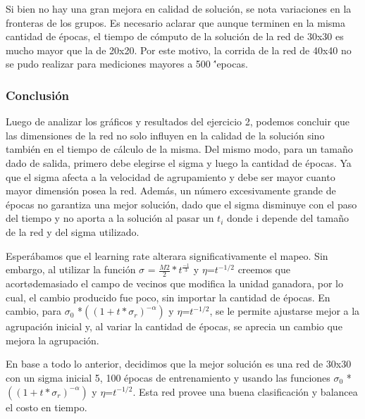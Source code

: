 Si bien no hay una gran mejora en calidad de soluci\'on, se nota variaciones en la fronteras de los grupos. Es necesario aclarar que aunque terminen en la misma cantidad de \'epocas, el tiempo de c\'omputo de la soluci\'on de la red de 30x30 es mucho mayor que la de 20x20. Por este motivo, la corrida de la red de 40x40 no se pudo realizar para mediciones mayores a 500 \''epocas.

\subsubsection{Conclusi\'on}

Luego de analizar los gr\'aficos y resultados del ejercicio 2, podemos concluir que las dimensiones de la red no solo influyen en la calidad de la soluci\'on sino tambi\'en en el tiempo de c\'alculo de la misma. Del mismo modo, para un tama\~no dado de salida, primero debe elegirse el sigma y luego la cantidad de \'epocas. Ya que el sigma afecta a la velocidad de agrupamiento y debe ser mayor cuanto mayor dimensi\'on posea la red. Adem\'as, un n\'umero excesivamente grande de \'epocas no garantiza una mejor soluci\'on, dado que el sigma disminuye con el paso del tiempo y no aporta a la soluci\'on al pasar un $t_i$ donde i depende del tama\~no de la red y del sigma utilizado.

Esper\'abamos que el learning rate alterara significativamente el mapeo. Sin embargo, al utilizar la funci\'on $\sigma$ = $\frac{M2}{2}*t^\frac{-1}{3}$ y $\eta$=$t^{-1/2}$  creemos que acort\o demasiado el campo de vecinos que modifica la unidad ganadora, por lo cual, el cambio producido fue poco, sin importar la cantidad de \'epocas.
En cambio, para $\sigma_0$ *$((1+t*\sigma_r)^{-\alpha})$ y $\eta$=$t^{-1/2}$, se le permite ajustarse mejor a la agrupaci\'on inicial y, al variar la cantidad de \'epocas, se aprecia un cambio que mejora la agrupaci\'on.

En base a todo lo anterior, decidimos que la mejor soluci\'on es una red de 30x30 con un sigma inicial 5, 100 \'epocas de entrenamiento y usando las funciones $\sigma_0$ *$((1+t*\sigma_r)^{-\alpha})$ 
y $\eta$=$t^{-1/2}$. Esta red provee una buena clasificaci\'on y balancea el costo en tiempo.

